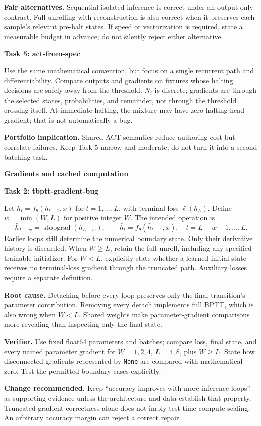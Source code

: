 \documentclass[11pt,a4paper]{article}
\newcommand{\sect}[2]{\vspace{3pt}{\small\color{accent}\textbf{#1}}\par{\LARGE\bfseries #2}\par\vspace{6pt}}
\newcommand{\sub}[1]{\vspace{4pt}\textbf{#1}\par}
\newcommand{\code}[1]{\texttt{#1}}
\begin{document}
\textbf{Fair alternatives.} Sequential isolated inference is correct under an output-only contract. Full unrolling with reconstruction is also correct when it preserves each sample's relevant pre-halt states. If speed or vectorization is required, state a measurable budget in advance; do not silently reject either alternative.

\sub{Task 5: act-from-spec}
Use the same mathematical convention, but focus on a single recurrent path and differentiability. Compare outputs and gradients on fixtures whose halting decisions are safely away from the threshold. $N_i$ is discrete; gradients are through the selected states, probabilities, and remainder, not through the threshold crossing itself. At immediate halting, the mixture may have zero halting-head gradient; that is not automatically a bug.

\textbf{Portfolio implication.} Shared ACT semantics reduce authoring cost but correlate failures. Keep Task 5 narrow and moderate; do not turn it into a second batching task.

\newpage
\sect{03 / TASKS 2 AND 3}{Gradients and cached computation}

\sub{Task 2: tbptt-gradient-bug}
Let $h_t=f_\theta(h_{t-1},x)$ for $t=1,\ldots,L$, with terminal loss $\ell(h_L)$. Define $w=\min(W,L)$ for positive integer $W$. The intended operation is
\[
\bar h_{L-w}=\operatorname{stopgrad}(h_{L-w}),\qquad
\bar h_t=f_\theta(\bar h_{t-1},x),\quad t=L-w+1,\ldots,L.
\]
Earlier loops still determine the numerical boundary state. Only their derivative history is discarded. When $W\geq L$, retain the full unroll, including any specified trainable initializer. For $W<L$, explicitly state whether a learned initial state receives no terminal-loss gradient through the truncated path. Auxiliary losses require a separate definition.

\textbf{Root cause.} Detaching before every loop preserves only the final transition's parameter contribution. Removing every detach implements full BPTT, which is also wrong when $W<L$. Shared weights make parameter-gradient comparisons more revealing than inspecting only the final state.

\textbf{Verifier.} Use fixed float64 parameters and batches; compare loss, final state, and every named parameter gradient for $W=1,2,4$, $L=4,8$, plus $W\geq L$. State how disconnected gradients represented by \code{None} are compared with mathematical zero. Test the permitted boundary cases explicitly.

\textbf{Change recommended.} Keep ``accuracy improves with more inference loops'' as supporting evidence unless the architecture and data establish that property. Truncated-gradient correctness alone does not imply test-time compute scaling. An arbitrary accuracy margin can reject a correct repair.
\end{document}
